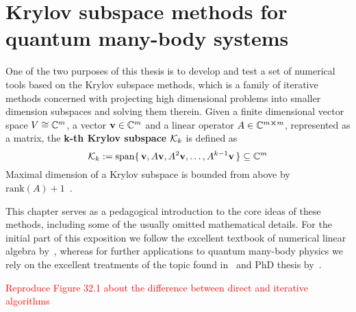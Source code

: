 
\chapter{Krylov subspace methods for quantum many-body systems}
\thispagestyle{chapterBeginStyle}

One of the two purposes of this thesis is to develop and test a set of numerical tools based on the Krylov subspace methods,
which is a family of iterative methods concerned with projecting high dimensional problems into smaller dimension subspaces
and solving them therein. Given a finite dimensional vector space \(V \cong \mathbb{C}^m \), a vector \(\vectorbold{v}\in \CC^m\) and
a linear operator \(A\in\mathbb{C}^{m\cross m}\), represented as a matrix, the \textbf{k-th Krylov subspace} \(\mathcal{K}_{k}\) is defined as 
\begin{equation}
		\K{k} := \mathrm{span}\{\,\vectorbold{v}, A\vectorbold{v}, A^2\vectorbold{v},\ldots,A^{k-1}\vectorbold{v} \,\} \subseteq \CC^m
	\label{def:krylov}
\end{equation}
Maximal dimension of a Krylov subspace is bounded from above by \(\mathrm{rank}(A) + 1\)~\autocite{Simoncini2015}.

This chapter serves as a
pedagogical introduction to the core ideas of these methods, including some of the usually omitted mathematical details.
For the initial part of this exposition we follow the excellent textbook of numerical linear algebra by~\textcite{Trefethen1997},
whereas for further applications to quantum many-body physics we rely on the excellent treatments of the topic
found in~\textcite{Sandvik2010} and PhD thesis by~\textcite{Crivelli2016}.

\textcolor{red}{Reproduce Figure 32.1 about the difference between direct and iterative algorithms}

